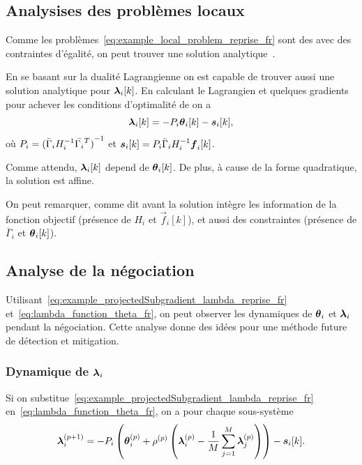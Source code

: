 \documentclass[../main.tex]{subfiles}
\begin{document}
\subsection{Analysises des problèmes locaux}\label{sec:analysis-local-problems_fr}
Comme les problèmes~\eqref{eq:example_local_problem_reprise_fr} sont des \qp{} avec des contraintes d'égalité, on peut trouver une solution analytique~\cite{BoydVandenberghe2004}.

En se basant sur la dualité Lagrangienne on est capable de trouver aussi une solution analytique pour $\lambdaik$.
En calculant le Lagrangien et quelques gradients pour achever les conditions d'optimalité de \KKT{} on a
\begin{equation}
  \label{eq:lambda_function_theta_fr}
  \lambdaik=-\Plin\thetaik-\sik,
\end{equation}
où ${P}_{i}={(\bar{\Gamma}_{i}H_{i}^{-1}\bar{\Gamma_{i}}^{T})}^{-1}$ et $\boldsymbol{s}_{i}[k]={P}_{i}\bar{\Gamma}_{i}H_{i}^{-1}\boldsymbol{f}_{i}[k]$.

Comme attendu, $\lambdaik$ depend de $\thetaik$.
De plus, à cause de la forme quadratique, la solution est affine.

\begin{remark}
  On peut remarquer, comme dit avant la solution intègre les information de la fonction objectif (présence de $H_{i}$ et $\vec{f}_{i}[k]$), et aussi des constraintes (présence de $\bar{\Gamma}_{i}$ et $\thetaik$).
\end{remark}

\subsection{Analyse de la négociation}\label{sec:analysis-negotiation_fr}
Utilisant~\eqref{eq:example_projectedSubgradient_lambda_reprise_fr} et~\eqref{eq:lambda_function_theta_fr}, on peut observer les dynamiques de $\boldsymbol{\theta}_{i}$ et $\boldsymbol{\lambda}_{i}$ pendant la négociation.
Cette analyse donne des idées pour une méthode future de détection et mitigation.

\subsubsection{Dynamique de $\boldsymbol{\lambda}_{i}$}
Si on substitue~\eqref{eq:example_projectedSubgradient_lambda_reprise_fr} en~\eqref{eq:lambda_function_theta_fr}, on a pour chaque sous-système
\begin{equation}
  \label{eq:lambda_dynamics}
\boldsymbol{\lambda}_{i}^{(p+1)}=-{P}_{i}\left(\boldsymbol{\theta}_{i}^{(p)}+\rho^{(p)}\left(\boldsymbol{\lambda}_{i}^{(p)}-\frac{1}{M}\sum_{j=1}^{M}\boldsymbol{\lambda}_j^{(p)}\right)\right)-\boldsymbol{s}_{i}[k].
\end{equation}
\end{document}
